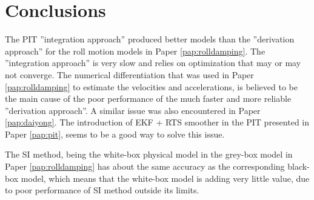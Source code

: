 \chapter{Conclusions\label{ch:conclusions}}
The PIT ''integration approach'' produced better models than the ''derivation approach'' for the roll motion models in Paper \ref{pap:rolldamping}. The ''integration approach'' is very slow and relies on optimization that may or may not converge.
The numerical differentiation that was used in Paper \ref{pap:rolldamping} to estimate the velocities and accelerations, is believed to be the main cause of the poor performance of the much faster and more reliable ''derivation approach''. A similar issue was also encountered in Paper \ref{pap:daiyong}.
The introduction of EKF + RTS smoother in the PIT presented in Paper \ref{pap:pit}, seems to be a good way to solve this issue.

The SI method, being the white-box physical model in the grey-box model in Paper \ref{pap:rolldamping} has about the same accuracy as the corresponding black-box model, which means that the white-box model is adding very little value, due to poor performance of SI method outside its limits.

 

   